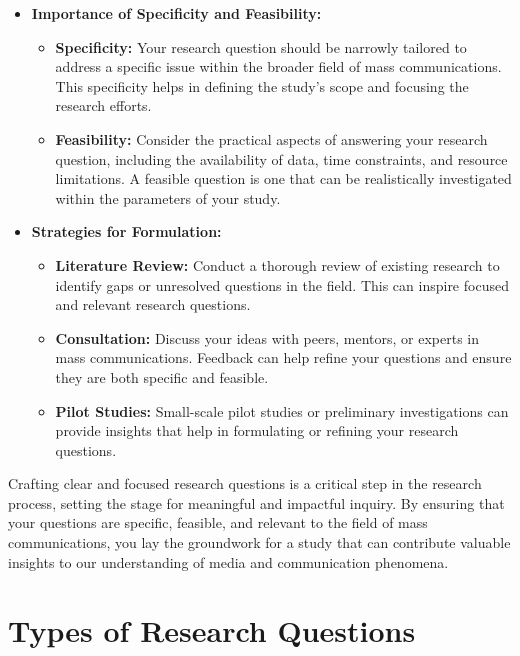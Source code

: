 \documentclass[
]{book}
\providecommand{\tightlist}{%
  \setlength{\itemsep}{0pt}\setlength{\parskip}{0pt}}
\begin{document}
\begin{itemize}
\tightlist
\item
  \textbf{Importance of Specificity and Feasibility:}

  \begin{itemize}
  \tightlist
  \item
    \textbf{Specificity:} Your research question should be narrowly tailored to address a specific issue within the broader field of mass communications. This specificity helps in defining the study's scope and focusing the research efforts.
  \item
    \textbf{Feasibility:} Consider the practical aspects of answering your research question, including the availability of data, time constraints, and resource limitations. A feasible question is one that can be realistically investigated within the parameters of your study.
  \end{itemize}
\item
  \textbf{Strategies for Formulation:}

  \begin{itemize}
  \tightlist
  \item
    \textbf{Literature Review:} Conduct a thorough review of existing research to identify gaps or unresolved questions in the field. This can inspire focused and relevant research questions.
  \item
    \textbf{Consultation:} Discuss your ideas with peers, mentors, or experts in mass communications. Feedback can help refine your questions and ensure they are both specific and feasible.
  \item
    \textbf{Pilot Studies:} Small-scale pilot studies or preliminary investigations can provide insights that help in formulating or refining your research questions.
  \end{itemize}
\end{itemize}

Crafting clear and focused research questions is a critical step in the research process, setting the stage for meaningful and impactful inquiry. By ensuring that your questions are specific, feasible, and relevant to the field of mass communications, you lay the groundwork for a study that can contribute valuable insights to our understanding of media and communication phenomena.

\hypertarget{types-of-research-questions}{%
\section{Types of Research Questions}\label{types-of-research-questions}}
\end{document}
